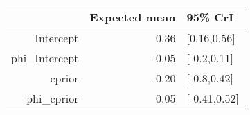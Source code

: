 \begin{tabular}{rrl}
  \hline
 & Expected mean & 95\% CrI \\ 
  \hline
Intercept & 0.36 & [0.16,0.56] \\ 
  phi\_Intercept & -0.05 & [-0.2,0.11] \\ 
  cprior & -0.20 & [-0.8,0.42] \\ 
  phi\_cprior & 0.05 & [-0.41,0.52] \\ 
   \hline
\end{tabular}


